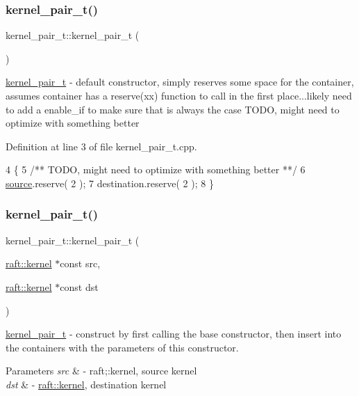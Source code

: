 \subsubsection{\texorpdfstring{kernel\+\_\+pair\+\_\+t()}{kernel\_pair\_t()}\hspace{0.1cm}{\footnotesize\ttfamily [1/3]}}
{\footnotesize\ttfamily kernel\+\_\+pair\+\_\+t\+::kernel\+\_\+pair\+\_\+t (\begin{DoxyParamCaption}{ }\end{DoxyParamCaption})}

\hyperlink{classkernel__pair__t}{kernel\+\_\+pair\+\_\+t} -\/ default constructor, simply reserves some space for the container, assumes container has a reserve(xx) function to call in the first place...likely need to add a enable\+\_\+if to make sure that is always the case T\+O\+DO, might need to optimize with something better 

Definition at line 3 of file kernel\+\_\+pair\+\_\+t.\+cpp.


\begin{DoxyCode}
4 \{\textcolor{comment}{}
5 \textcolor{comment}{    /** TODO, might need to optimize with something better **/}
6     \hyperlink{classsource}{source}.reserve( 2 );
7     destination.reserve( 2 );
8 \}
\end{DoxyCode}
\hypertarget{classkernel__pair__t_a61db7ee1e6f651c096af617f4449dd73}{}\label{classkernel__pair__t_a61db7ee1e6f651c096af617f4449dd73} 
\subsubsection{\texorpdfstring{kernel\+\_\+pair\+\_\+t()}{kernel\_pair\_t()}\hspace{0.1cm}{\footnotesize\ttfamily [2/3]}}
{\footnotesize\ttfamily kernel\+\_\+pair\+\_\+t\+::kernel\+\_\+pair\+\_\+t (\begin{DoxyParamCaption}\item[{\hyperlink{classraft_1_1kernel}{raft\+::kernel} $\ast$const}]{src,  }\item[{\hyperlink{classraft_1_1kernel}{raft\+::kernel} $\ast$const}]{dst }\end{DoxyParamCaption})}

\hyperlink{classkernel__pair__t}{kernel\+\_\+pair\+\_\+t} -\/ construct by first calling the base constructor, then insert into the containers with the parameters of this constructor. 
\begin{DoxyParams}{Parameters}
{\em src} & -\/ raft;\+:kernel, source kernel \\
\hline
{\em dst} & -\/ \hyperlink{classraft_1_1kernel}{raft\+::kernel}, destination kernel \\
\hline
\end{DoxyParams}


